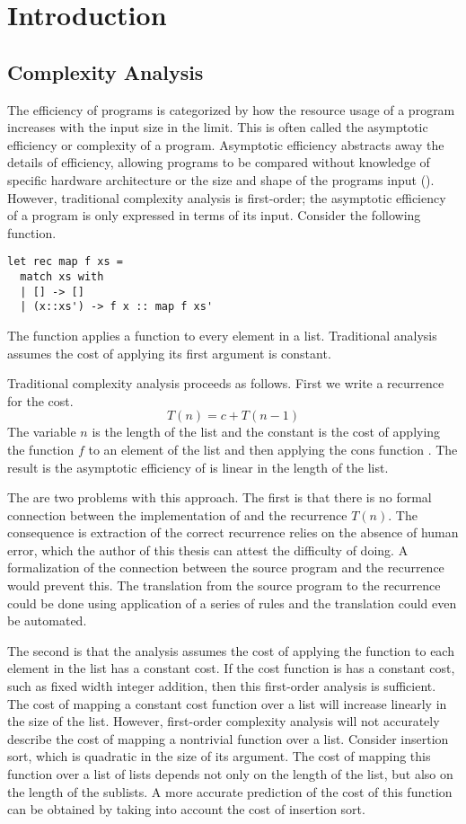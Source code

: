 \chapter{Introduction}

\section{Complexity Analysis}

The efficiency of programs is categorized by how the resource usage of a
program increases with the input size in the limit.  This is often called the
asymptotic efficiency or complexity of a program.  Asymptotic efficiency
abstracts away the details of efficiency, allowing programs to be compared
without knowledge of specific hardware architecture or the size and shape of
the programs input (\citet{Cormen2001}).  However, traditional complexity
analysis is first-order; the asymptotic efficiency of a program is only
expressed in terms of its input.  Consider the following function.
%
\lstset{language=[Objective]Caml}
\begin{lstlisting}
let rec map f xs =
  match xs with
  | [] -> []
  | (x::xs') -> f x :: map f xs'
\end{lstlisting}
%
The function  applies a function to every element in a list.
Traditional analysis assumes the cost of applying its first argument is
constant.


Traditional complexity analysis proceeds as follows.  First we write a
recurrence for the cost.  \[ T(n) = c + T(n-1) \] The variable $n$ is the
length of the list and the constant  is the cost of applying the function
$f$ to an element of the list and then applying the cons function \T{::}. The
result is the asymptotic efficiency of  is linear in the length of the
list.

The are two problems with this approach. The first is that there is no formal
connection between the implementation of  and the recurrence $T(n)$. The
consequence is extraction of the correct recurrence relies on the absence of
human error, which the author of this thesis can attest the difficulty of
doing. A formalization of the connection between the source program and
the recurrence would prevent this. The translation from the source program to
the recurrence could be done using application of a series of rules and the
translation could even be automated.

The second is that the analysis assumes the cost of applying the function  to
each element in the list has a constant cost. If the cost function is has a
constant cost, such as fixed width integer addition, then this first-order
analysis is sufficient.  The cost of mapping a constant cost function over a
list will increase linearly in the size of the list.  However, first-order
complexity analysis will not accurately describe the cost of mapping a
nontrivial function over a list.  Consider insertion sort, which is quadratic
in the size of its argument.  The cost of mapping this function over a list of
lists depends not only on the length of the list, but also on the length of the
sublists.  A more accurate prediction of the cost of this function can be
obtained by taking into account the cost of insertion sort.

